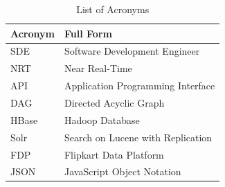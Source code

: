 \begin{justify}
    \begin{table}[h]
        \centering
        \small
        \caption{List of Acronyms}
        \renewcommand{\arraystretch}{1.5}
        \begin{tabular}{|p{3cm}|p{9cm}|}
            \hline
            \textbf{Acronym} & \textbf{Full Form} \\
            \hline
            SDE & Software Development Engineer \\
            \hline
            NRT & Near Real-Time \\
            \hline
            API & Application Programming Interface \\
            \hline
            DAG & Directed Acyclic Graph \\
            \hline
            HBase & Hadoop Database \\
            \hline
            Solr & Search on Lucene with Replication \\
            \hline
            FDP & Flipkart Data Platform \\
            \hline
            JSON & JavaScript Object Notation \\
            \hline
        \end{tabular}
        \label{tab:acronyms}
    \end{table}
\end{justify}